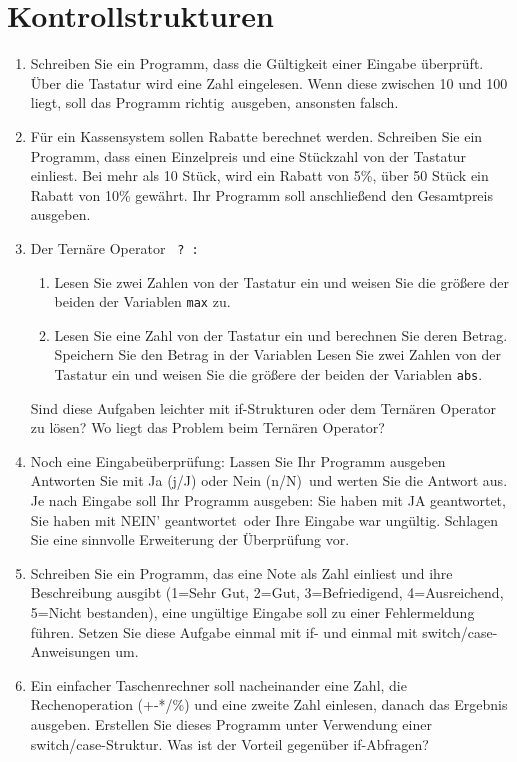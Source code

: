\documentclass[paper=a4, fontsize=11pt, twoside]{scrartcl}
\begin{document}
\section*{Kontrollstrukturen}
\begin{enumerate}
  \item Schreiben Sie ein Programm, dass die Gültigkeit einer Eingabe überprüft. Über die Tastatur wird eine Zahl eingelesen. Wenn diese zwischen 10 und 100 liegt, soll das Programm \glqq richtig\grqq\, ausgeben, ansonsten \glqq falsch\grqq.%
  \item Für ein Kassensystem sollen Rabatte berechnet werden. Schreiben Sie ein Programm, dass einen Einzelpreis und eine Stückzahl von der Tastatur einliest. Bei mehr als 10 Stück, wird ein Rabatt von 5\%, über 50 Stück ein Rabatt von 10\% gewährt. Ihr Programm soll anschließend den Gesamtpreis ausgeben.
  \item Der Ternäre Operator \texttt{ ? :}
   \begin{enumerate}
    \item Lesen Sie zwei Zahlen von der Tastatur ein und weisen Sie die größere der beiden der Variablen \texttt{max} zu.
    \item Lesen Sie eine Zahl von der Tastatur ein und berechnen Sie deren Betrag. Speichern Sie den Betrag in der Variablen Lesen Sie zwei Zahlen von der Tastatur ein und weisen Sie die größere der beiden der Variablen \texttt{abs}.
   \end{enumerate}
   Sind diese Aufgaben leichter mit if-Strukturen oder dem Ternären Operator zu lösen? Wo liegt das Problem beim Ternären Operator?
  \item Noch eine Eingabeüberprüfung: Lassen Sie Ihr Programm ausgeben \glqq Antworten Sie mit Ja (j/J) oder Nein (n/N)\grqq\, und werten Sie die Antwort aus. Je nach Eingabe soll Ihr Programm ausgeben: \glqq Sie haben mit JA geantwortet\grqq, \glqq Sie haben mit NEIN' geantwortet\grqq\, oder \glqq Ihre Eingabe war ungültig\grqq. Schlagen Sie eine sinnvolle Erweiterung der Überprüfung vor.
  \item Schreiben Sie ein Programm, das eine Note als Zahl einliest und ihre Beschreibung ausgibt (1=Sehr Gut, 2=Gut, 3=Befriedigend, 4=Ausreichend, 5=Nicht bestanden), eine ungültige Eingabe soll zu einer Fehlermeldung führen. Setzen Sie diese Aufgabe einmal mit if- und einmal mit switch/case-Anweisungen um.
  \item Ein einfacher Taschenrechner soll nacheinander eine Zahl, die Rechenoperation (+-*/\%) und eine zweite Zahl einlesen, danach das Ergebnis ausgeben. Erstellen Sie dieses Programm unter Verwendung einer switch/case-Struktur. Was ist der Vorteil gegenüber if-Abfragen?
  
\end{enumerate}
\end{document}

